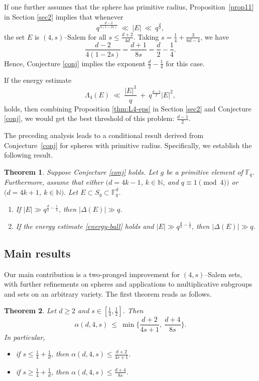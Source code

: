 \documentclass[11pt]{article}
\newtheorem{theorem}{Theorem}
\begin{document}
If one further assumes that the sphere has primitive radius, Proposition~\ref{prop11} in Section \ref{sec2} implies that whenever
\[
q^{\frac{d-2}{4(1-2s)}}\ \ll\ |E|\ \ll\ q^{\frac{d}{2}},
\]
the set $E$ is $(4,s)$--Salem for all $s\le \tfrac{d+2}{4d}$. Taking $s=\tfrac{1}{4}+\tfrac{3}{8d-4}$, we have 
\[\frac{d-2}{4(1-2s)}=\frac{d+1}{8s}=\frac{d}{2}-\frac{1}{4}.\]
Hence, Conjecture \ref{conj} implies the exponent $\tfrac{d}{2}-\tfrac{1}{4}$ for this case.

If the energy estimate 
\begin{equation}\label{energy-ball}
\Lambda_4(E)\ \ll\ \frac{|E|^3}{q}\ +\ q^{\frac{d-3}{2}}|E|^2,
\end{equation}
holds, then  combining Proposition \ref{thm:L4-eps} in Section \ref{sec2}  and Conjecture \ref{conj}, we would get  the best threshold of this problem: $\frac{d-1}{2}$.



The preceding analysis leads to a conditional result derived from Conjecture~\ref{conj} for spheres with primitive radius. Specifically, we establish the following result.
\begin{theorem}\label{Kohsharp}
Suppose Conjecture \ref{conj} holds. Let $g$ be a primitive element of $\mathbb{F}_q$. Furthermore, assume that either $(d = 4k - 1$, $k\in \mathbb{N}$, and $q \equiv 1 \pmod{4})$ or $(d = 4k + 1$, $k\in \mathbb{N}).$ Let $E\subset S_g\subset \mathbb{F}_q^d$.
\begin{enumerate}
    \item[(i)] If $|E|\gg q^{\frac{d}{2}-\frac{1}{4}}$, then $|\Delta(E)|\gg q$.
    \item[(ii)] If the energy estimate \eqref{energy-ball} holds and $|E|\gg q^{\frac{d}{2}-\frac{1}{2}}$, then $|\Delta(E)|\gg q$.
\end{enumerate}
\end{theorem}


\subsection{Main results}
Our main contribution is a two-pronged improvement for $(4, s)$--Salem sets, with further refinements on spheres and applications to multiplicative subgroups and sets on an arbitrary variety. The first theorem reads as follows.


\begin{theorem}\label{thm1}
Let $d \geq 2$ and $s \in [\frac{1}{4}, \frac{1}{2}]$. Then
\[
\alpha(d,4,s)\ \le\ \min\Big\{\frac{d+2}{4s+1},\ \frac{d+4}{8s}\Big\}.
\]
In particular, 
\begin{itemize}
    \item[(i)] if $s\le \frac{1}{4}+\frac{1}{d}$, then $\alpha(d, 4, s)\le \frac{d+2}{4s+1}$.
    \item[(ii)] if $s\ge \frac{1}{4}+\frac{1}{d}$, then $\alpha(d, 4, s)\le \frac{d+4}{8s}$.
\end{itemize}
\end{theorem}
\end{document}
